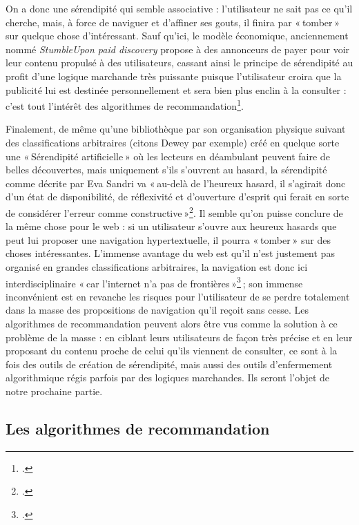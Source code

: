 On a donc une sérendipité qui semble associative : l’utilisateur ne sait pas ce qu’il cherche, mais, à force de naviguer et d’affiner ses gouts, il finira par « tomber » sur quelque chose d’intéressant. Sauf qu’ici, le modèle économique, anciennement nommé \textit{StumbleUpon paid discovery} propose à des annonceurs de payer pour voir leur contenu propulsé à des utilisateurs, cassant ainsi le principe de sérendipité au profit d’une logique marchande très puissante puisque l’utilisateur croira que la publicité lui est destinée personnellement et sera bien plus enclin à la consulter : c’est tout l’intérêt des algorithmes de recommandation\footcite{author2012}.

Finalement, de même qu’une bibliothèque par son organisation physique suivant des classifications arbitraires (citons Dewey par exemple) créé en quelque sorte une « Sérendipité artificielle » où les lecteurs en déambulant peuvent faire de belles découvertes, mais uniquement s’ils s’ouvrent au hasard, la sérendipité comme décrite par Eva Sandri va « au-delà de l’heureux hasard, il s’agirait donc d’un état de disponibilité, de réflexivité et d’ouverture d’esprit qui ferait en sorte de considérer l’erreur comme constructive »\footcite[p. 14]{zotero-221}. Il semble qu’on puisse conclure de la même chose pour le web : si un utilisateur s’ouvre aux heureux hasards que peut lui proposer une navigation hypertextuelle, il pourra « tomber » sur des choses intéressantes. L’immense avantage du web est qu’il n’est justement pas organisé en grandes classifications arbitraires, la navigation est donc ici interdisciplinaire « car l’internet n’a pas de frontières »\footcite[8 minutes 34 secondes]{2015} ; son immense inconvénient est en revanche les risques pour l’utilisateur de se perdre totalement dans la masse des propositions de navigation qu’il reçoit sans cesse. Les algorithmes de recommandation peuvent alors être vus comme la solution à ce problème de la masse : en ciblant leurs utilisateurs de façon très précise et en leur proposant du contenu proche de celui qu’ils viennent de consulter, ce sont à la fois des outils de création de sérendipité, mais aussi des outils d’enfermement algorithmique régis parfois par des logiques marchandes. Ils seront l’objet de notre prochaine partie.


\subsection{Les algorithmes de recommandation}



